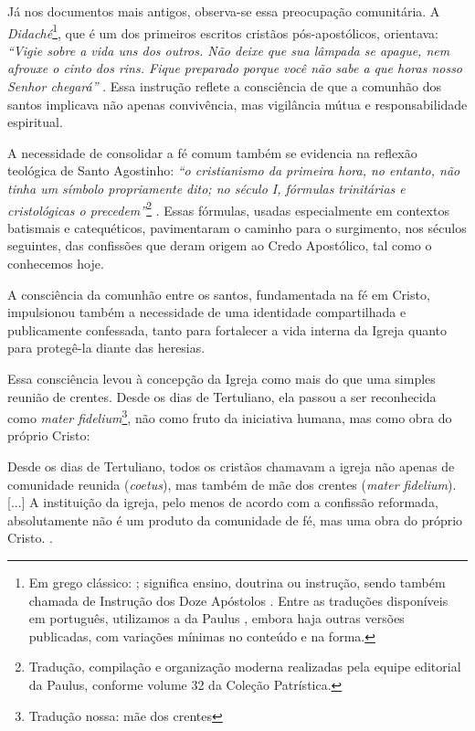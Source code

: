 Já nos documentos mais antigos, observa-se essa preocupação comunitária. A \textit{Didaché}\footnote{Em grego clássico: \textit{}; significa ensino, doutrina ou instrução, sendo também chamada de Instrução dos Doze Apóstolos \cite{wikididaque}. Entre as traduções disponíveis em português, utilizamos a da Paulus \cite{didachePaulus2013}, embora haja outras versões publicadas, com variações mínimas no conteúdo e na forma.}, que é um dos primeiros escritos cristãos pós-apostólicos, orientava: \textit{``Vigie sobre a vida uns dos outros. Não deixe que sua lâmpada se apague, nem afrouxe o cinto dos rins. Fique preparado porque você não sabe a que horas nosso Senhor chegará''} \cite{didachePaulus2013}. Essa instrução reflete a consciência de que a comunhão dos santos implicava não apenas convivência, mas vigilância mútua e responsabilidade espiritual.

A necessidade de consolidar a fé comum também se evidencia na reflexão teológica de Santo Agostinho: \textit{``o cristianismo da primeira hora, no entanto, não tinha um símbolo propriamente dito; no século I, fórmulas trinitárias e cristológicas o precedem''}\footnote{Tradução, compilação e organização moderna realizadas pela equipe editorial da Paulus, conforme volume 32 da Coleção Patrística.} \cite[p.~8]{santos2013}. Essas fórmulas, usadas especialmente em contextos batismais e catequéticos, pavimentaram o caminho para o surgimento, nos séculos seguintes, das confissões que deram origem ao Credo Apostólico, tal como o conhecemos hoje.

A consciência da comunhão entre os santos, fundamentada na fé em Cristo, impulsionou também a necessidade de uma identidade compartilhada e publicamente confessada, tanto para fortalecer a vida interna da Igreja quanto para protegê-la diante das heresias.

Essa consciência levou à concepção da Igreja como mais do que uma simples reunião de crentes. Desde os dias de Tertuliano, ela passou a ser reconhecida como \textit{mater fidelium}\footnote{Tradução nossa: mãe dos crentes}, não como fruto da iniciativa humana, mas como obra do próprio Cristo:

\begin{citacao}
    Desde os dias de Tertuliano, todos os cristãos chamavam a igreja não apenas de comunidade reunida (\textit{coetus}), mas também de mãe dos crentes (\textit{mater fidelium}). [...] A instituição da igreja, pelo menos de acordo com a confissão reformada, absolutamente não é um produto da comunidade de fé, mas uma obra do próprio Cristo. \cite[p.~335]{bavinck2012}.
\end{citacao}

